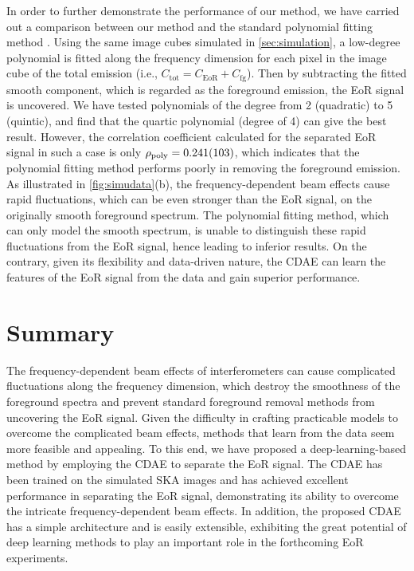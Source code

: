 \documentclass[letters,fleqn,usenatbib,onecolumn]{mnras}
\newcommand{\R}[1]{\mathrm{#1}}
\begin{document}
In order to further demonstrate the performance of our method, we have
carried out a comparison between our method and the standard polynomial
fitting method \citep[e.g.,][]{wang2006,liu2009ps}.
Using the same image cubes simulated in \autoref{sec:simulation},
a low-degree polynomial is fitted along the frequency dimension for each
pixel in the image cube of the total emission (i.e.,
$C_{\R{tot}} = C_{\R{EoR}} + C_{\R{fg}}$).
Then by subtracting the fitted smooth component, which is regarded as
the foreground emission, the EoR signal is uncovered.
We have tested polynomials of the degree from 2 (quadratic) to
5 (quintic), and find that the quartic polynomial (degree of 4)
can give the best result.
However, the correlation coefficient calculated for the separated EoR
signal in such a case is only $\rho_{\R{poly}} = \num{0.241 +- 0.103}$,
which indicates that the polynomial fitting method
performs poorly in removing the foreground emission.
As illustrated in \autoref{fig:simudata}(b), the frequency-dependent
beam effects cause rapid fluctuations, which can be even stronger than
the EoR signal, on the originally smooth foreground spectrum.
The polynomial fitting method, which can only model the smooth
spectrum, is unable to distinguish these rapid fluctuations from the
EoR signal, hence leading to inferior results.
{\color{cyan}%
On the contrary, given its flexibility and data-driven nature,
the CDAE can learn the features of the EoR signal from the data and
gain superior performance.}


\section{Summary}
\label{sec:summary}

The frequency-dependent beam effects of interferometers can cause
complicated fluctuations along the frequency dimension,
which destroy the smoothness of the foreground spectra and prevent
standard foreground removal methods from uncovering the EoR signal.
Given the difficulty in crafting practicable models to overcome the
complicated beam effects, methods that learn from the data seem more
feasible and appealing.
To this end, we have proposed a deep-learning-based method by employing
the CDAE to separate the EoR signal.
The CDAE has been trained on the simulated SKA images and has achieved
excellent performance in separating the EoR signal, demonstrating its
ability to overcome the intricate frequency-dependent beam effects.
In addition, the proposed CDAE has a simple architecture and is easily
extensible, exhibiting the great potential of deep learning methods
to play an important role in the forthcoming EoR experiments.
\end{document}

